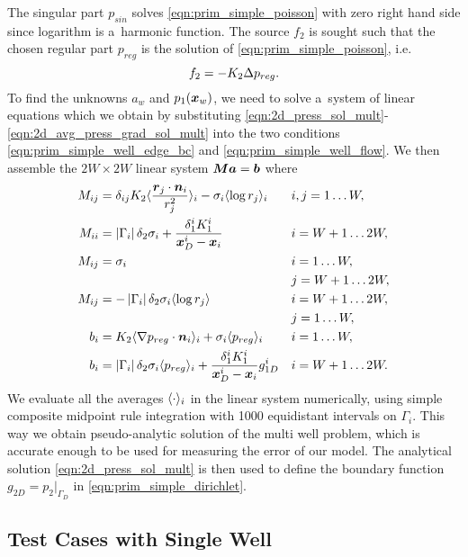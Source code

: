 The singular part $p_{sin}$ solves \eqref{eqn:prim_simple_poisson} with zero right hand side since logarithm is a~harmonic function.
The source $f_2$ is sought such that the chosen regular part $p_{reg}$ is the solution of \eqref{eqn:prim_simple_poisson}, i.e.
\begin{equation}
    f_2 = -K_2 \Delta p_{reg}.
\end{equation}
To find the unknowns $a_w$ and $p_1(\mathbf{\boldsymbol{x}}_w)$, we need to solve a~system of linear equations
which we obtain by substituting \eqref{eqn:2d_press_sol_mult}-\eqref{eqn:2d_avg_press_grad_sol_mult}
into the two conditions \eqref{eqn:prim_simple_well_edge_bc} and \eqref{eqn:prim_simple_well_flow}.
We then assemble the $2W\times 2W$ linear system $\mathbf{\boldsymbol{M}}\mathbf{\boldsymbol{a}} = \mathbf{\boldsymbol{b}}$ where
\begin{subequations}
\label{eqn:2d_press_linear_system}
\begin{align}
M_{ij} &= \delta_{ij} K_2\avg{\frac{\vc r_j \cdot \vc n_i}{r_j^2}}_i - \sigma_i\avg{\log r_j}_i && i,j=1\ldots W, \\
%
M_{ii} &= \abs{\Gamma_i}\delta_2\sigma_i + \frac{\delta^i_1 K^i_1}{\bx^i_D-\bx_i} && i=W+1 \ldots 2W,\\
%
M_{ij} &= \sigma_i && i=1\ldots W,\\
    &&& j=W+1 \ldots 2W,\\
M_{ij} &= -\abs{\Gamma_i}\delta_2\sigma_i \avg{\log r_j} && i=W+1 \ldots 2W,\\
    &&& j=1 \ldots W,\\
b_{i} &= K_2 \avg{\grad p_{reg}\cdot \vc n_i}_i + \sigma_i\avg{p_{reg}}_i && i=1 \ldots W,\\
b_{i} &= \abs{\Gamma_i}\delta_2\sigma_i \avg{p_{reg}}_i + \frac{\delta^i_1 K^i_1}{\bx^i_D-\bx_i}g^i_{1D} && i=W+1\ldots 2W.
\end{align}
\end{subequations}
We evaluate all the averages $\langle\cdot\rangle_i$ in the linear system numerically,
using simple composite midpoint rule integration with 1000 equidistant intervals on $\Gamma_i$.
This way we obtain pseudo-analytic solution of the multi well problem, which is accurate enough
to be used for measuring the error of our model.
The analytical solution \eqref{eqn:2d_press_sol_mult} is then used 
to define the boundary function $g_{2D} = p_2|_{\Gamma_D}$ in \eqref{eqn:prim_simple_dirichlet}.


\subsection{Test Cases with Single Well}
\label{sec:results}

